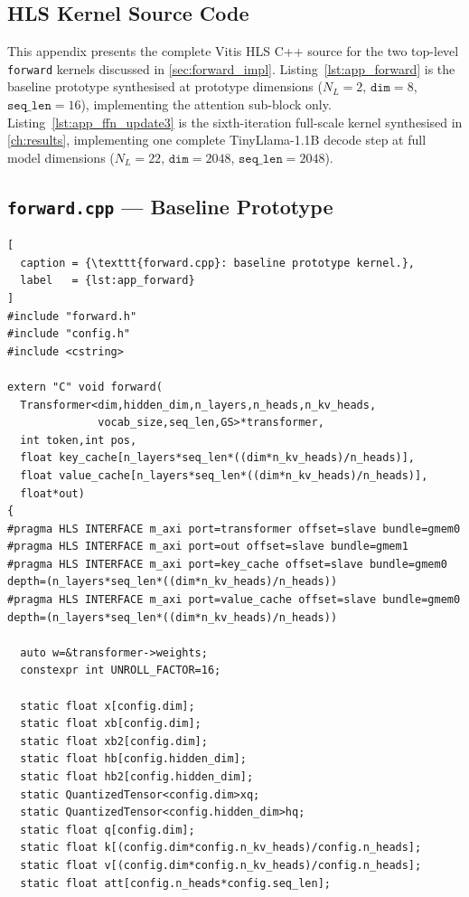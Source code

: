 \begin{appendices}

\chapter{HLS Kernel Source Code}
\label{app:hls_source}

This appendix presents the complete Vitis HLS C++ source for the two
top-level \texttt{forward} kernels discussed in
\cref{sec:forward_impl}. Listing~\ref{lst:app_forward} is the baseline
prototype synthesised at prototype dimensions ($N_L = 2$,
$\texttt{dim} = 8$, $\texttt{seq\_len} = 16$), implementing the
attention sub-block only. Listing~\ref{lst:app_ffn_update3} is the
sixth-iteration full-scale kernel synthesised in \cref{ch:results},
implementing one complete TinyLlama-1.1B decode step at full model
dimensions ($N_L = 22$, $\texttt{dim} = 2048$,
$\texttt{seq\_len} = 2048$).

\section{\texttt{forward.cpp} --- Baseline Prototype}
\label{app:forward_baseline}

\begin{lstlisting}[
  caption = {\texttt{forward.cpp}: baseline prototype kernel.},
  label   = {lst:app_forward}
]
#include "forward.h"
#include "config.h"
#include <cstring>

extern "C" void forward(
  Transformer<dim,hidden_dim,n_layers,n_heads,n_kv_heads,
              vocab_size,seq_len,GS>*transformer,
  int token,int pos,
  float key_cache[n_layers*seq_len*((dim*n_kv_heads)/n_heads)],
  float value_cache[n_layers*seq_len*((dim*n_kv_heads)/n_heads)],
  float*out)
{
#pragma HLS INTERFACE m_axi port=transformer offset=slave bundle=gmem0
#pragma HLS INTERFACE m_axi port=out offset=slave bundle=gmem1
#pragma HLS INTERFACE m_axi port=key_cache offset=slave bundle=gmem0 depth=(n_layers*seq_len*((dim*n_kv_heads)/n_heads))
#pragma HLS INTERFACE m_axi port=value_cache offset=slave bundle=gmem0 depth=(n_layers*seq_len*((dim*n_kv_heads)/n_heads))

  auto w=&transformer->weights;
  constexpr int UNROLL_FACTOR=16;

  static float x[config.dim];
  static float xb[config.dim];
  static float xb2[config.dim];
  static float hb[config.hidden_dim];
  static float hb2[config.hidden_dim];
  static QuantizedTensor<config.dim>xq;
  static QuantizedTensor<config.hidden_dim>hq;
  static float q[config.dim];
  static float k[(config.dim*config.n_kv_heads)/config.n_heads];
  static float v[(config.dim*config.n_kv_heads)/config.n_heads];
  static float att[config.n_heads*config.seq_len];


\end{lstlisting}
\end{appendices}
